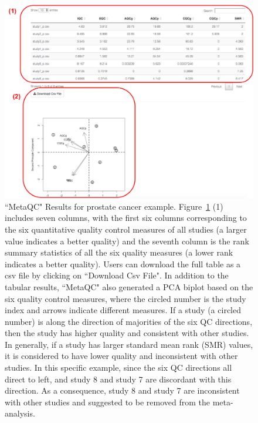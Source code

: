 \begin{figure}[H]
\begin{center}
\includegraphics[scale=0.65]{./figure/metaQC/metaQCresult_Prostate.pdf}
\caption{``MetaQC" Results for prostate cancer example.
Figure~\ref{fig:MetaQCresult} {\color{red} (1)} includes seven columns, 
with the first six columns corresponding to the six quantitative quality control measures of all studies (a larger value indicates a better quality) and the seventh column is the rank summary statistics of all the six quality measures (a lower rank indicates a better quality). 
Users can download the full table as a csv file by clicking on ``Download Csv File". 
In addition to the tabular results, ``MetaQC" also generated a PCA biplot based on the six quality control measures, 
where the circled number is the study index and arrows indicate different measures. 
If a study (a circled number) is along the direction of majorities of the six QC directions, then the study has higher quality and consistent with other studies.
In generally, if a study has larger standard mean rank (SMR) values, 
it is considered to have lower quality and inconsistent with other studies.
In this specific example, since the six QC directions all direct to left, 
and study 8 and study 7 are discordant with this direction.
As a consequence, study 8 and study 7 are inconsistent with other studies and suggested to be removed from the meta-analysis.
}
\label{fig:MetaQCresult}
\end{center}
\end{figure}


